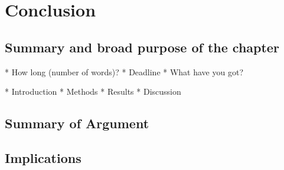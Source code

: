 
\chapter{Conclusion}

\ifpdf
    \graphicspath{{chapter6/figs/raster/}{chapter6/figs/PDF/}{chapter6/figs/}}
\else
    \graphicspath{{chapter6/figs/vector/}{chapter6/figs/}}
\fi

\section*{Summary and broad purpose of the chapter}
* How long (number of words)?
* Deadline
* What have you got?

* Introduction
* Methods
* Results
* Discussion

\section[Short title]{Summary of Argument}


\section[Short title]{Implications}
